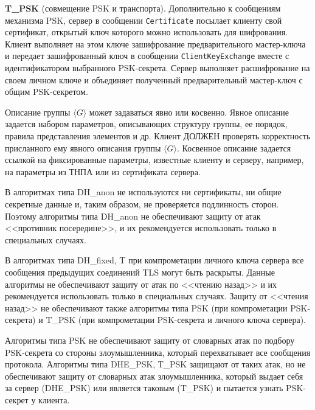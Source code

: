 {\bf T\_PSK} (совмещение PSK и транспорта). Дополнительно к сообщениям 
механизма PSK, сервер в сообщении \lstinline{Certificate} посылает клиенту 
свой сертификат, открытый ключ которого можно использовать для 
шифрования. Клиент выполняет на этом ключе зашифрование предварительного 
мастер-ключа и передает зашифрованный ключ в сообщении 
\lstinline{ClientKeyExchange} вместе с идентификатором выбранного 
PSK-секрета. Сервер выполняет расшифрование на своем личном ключе и 
объединяет полученный предварительный мастер-ключ с общим PSK-секретом. 

\begin{note}
Описание группы $\langle G \rangle$ может задаваться явно или косвенно. Явное 
описание задается набором параметров, описывающих структуру группы, ее порядок, 
правила представления элементов и др. Клиент ДОЛЖЕН проверять
корректность присланного ему явного описания группы $\langle G \rangle$. 
Косвенное описание задается ссылкой на фиксированные параметры, известные 
клиенту и серверу, например, на параметры из ТНПА или из сертификата 
сервера.
\end{note}

\begin{note}
В алгоритмах типа DH\_anon не используются ни 
сертификаты, ни общие секретные данные и, таким образом, не проверяется 
подлинность сторон. Поэтому алгоритмы типа DH\_anon не обеспечивают защиту 
от атак <<противник посередине>>, и их рекомендуется использовать только в 
специальных случаях.
\end{note}

\begin{note}
В алгоритмах типа DH\_fixed, T при компрометации 
личного ключа сервера все сообщения предыдущих соединений TLS могут быть 
раскрыты. Данные алгоритмы не обеспечивают защиту от атак по <<чтению 
назад>> и их рекомендуется использовать только в специальных случаях. 
Защиту от <<чтения назад>> не обеспечивают также алгоритмы типа PSK (при 
компрометации PSK-секрета) и T\_PSK (при компрометации PSK-секрета и 
личного ключа сервера).
\end{note}
 
\begin{note}
Алгоритмы типа PSK не обеспечивают защиту от словарных атак по подбору
PSK-секрета со стороны злоумышленника, который перехватывает все сообщения
протокола. Алгоритмы типа DHE\_PSK, Т\_PSK защищают от таких атак, но не
обеспечивают защиту от словарных атак злоумышленника, который выдает себя за
сервер (DHE\_PSK) или является таковым (T\_PSK) и пытается узнать PSK-секрет у
клиента.
\end{note}

